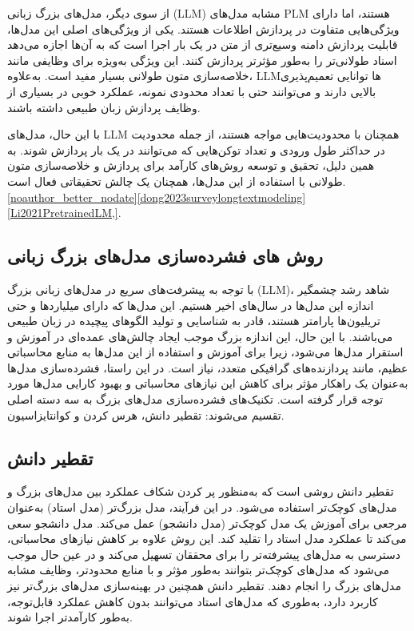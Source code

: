 از سوی دیگر، مدل‌های بزرگ زبانی (LLM) مشابه مدل‌های PLM هستند، اما دارای ویژگی‌هایی متفاوت در پردازش اطلاعات هستند. یکی از ویژگی‌های اصلی این مدل‌ها، قابلیت پردازش دامنه وسیع‌تری از متن در یک بار اجرا است که به آن‌ها اجازه می‌دهد اسناد طولانی‌تر را به‌طور مؤثرتر پردازش کنند. این ویژگی به‌ویژه برای وظایفی مانند خلاصه‌سازی متون طولانی بسیار مفید است. به‌علاوه، LLMها توانایی تعمیم‌پذیری بالایی دارند و می‌توانند حتی با تعداد محدودی نمونه، عملکرد خوبی در بسیاری از وظایف پردازش زبان طبیعی داشته باشند.

با این حال، مدل‌های LLM همچنان با محدودیت‌هایی مواجه هستند، از جمله محدودیت در حداکثر طول ورودی و تعداد توکن‌هایی که می‌توانند در یک بار پردازش شوند. به همین دلیل، تحقیق و توسعه روش‌های کارآمد برای پردازش و خلاصه‌سازی متون طولانی با استفاده از این مدل‌ها، همچنان یک چالش تحقیقاتی فعال است.
 \ref{noauthor_better_nodate}\ref{dong2023surveylongtextmodeling} \ref{Li2021PretrainedLM,}.
 \subsection{روش های فشرده‌سازی مدل‌های بزرگ زبانی}
 با توجه به پیشرفت‌های سریع در مدل‌های زبانی بزرگ (LLM)، شاهد رشد چشمگیر اندازه این مدل‌ها در سال‌های اخیر هستیم. این مدل‌ها که دارای میلیاردها و حتی تریلیون‌ها پارامتر هستند، قادر به شناسایی و تولید الگوهای پیچیده در زبان طبیعی می‌باشند. با این حال، این اندازه بزرگ موجب ایجاد چالش‌های عمده‌ای در آموزش و استقرار مدل‌ها می‌شود، زیرا برای آموزش و استفاده از این مدل‌ها به منابع محاسباتی عظیم، مانند پردازنده‌های گرافیکی متعدد، نیاز است. در این راستا، فشرده‌سازی مدل‌ها به‌عنوان یک راهکار مؤثر برای کاهش این نیازهای محاسباتی و بهبود کارایی مدل‌ها مورد توجه قرار گرفته است. تکنیک‌های فشرده‌سازی مدل‌های بزرگ به سه دسته اصلی تقسیم می‌شوند: تقطیر دانش، هرس کردن و کوانتایزاسیون.
 \subsection{تقطیر دانش}
 
 تقطیر دانش روشی است که به‌منظور پر کردن شکاف عملکرد بین مدل‌های بزرگ و مدل‌های کوچک‌تر استفاده می‌شود. در این فرآیند، مدل بزرگ‌تر (مدل استاد) به‌عنوان مرجعی برای آموزش یک مدل کوچک‌تر (مدل دانشجو) عمل می‌کند. مدل دانشجو سعی می‌کند تا عملکرد مدل استاد را تقلید کند. این روش علاوه بر کاهش نیازهای محاسباتی، دسترسی به مدل‌های پیشرفته‌تر را برای محققان تسهیل می‌کند و در عین حال موجب می‌شود که مدل‌های کوچک‌تر بتوانند به‌طور مؤثر و با منابع محدود‌تر، وظایف مشابه مدل‌های بزرگ را انجام دهند. تقطیر دانش همچنین در بهینه‌سازی مدل‌های بزرگ‌تر نیز کاربرد دارد، به‌طوری که مدل‌های استاد می‌توانند بدون کاهش عملکرد قابل‌توجه، به‌طور کارآمدتر اجرا شوند.
